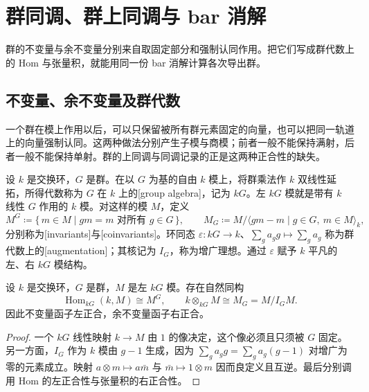 
\section{群同调、群上同调与 bar 消解}
\label{b4:sec:1101}

群的不变量与余不变量分别来自取固定部分和强制认同作用。把它们写成群代数上的 Hom 与张量积，就能用同一份 bar 消解计算各次导出群。

%
%

\subsection{不变量、余不变量及群代数}
\label{b4:subsec:1101:01}

一个群在模上作用以后，可以只保留被所有群元素固定的向量，也可以把同一轨道上的向量强制认同。这两种做法分别产生子模与商模；前者一般不能保持满射，后者一般不能保持单射。群的上同调与同调记录的正是这两种正合性的缺失。

\begin{definition}\label{b4:def:group-invariants}
设 \(k\) 是交换环，\(G\) 是群。在以 \(G\) 为基的自由 \(k\) 模上，将群乘法作 \(k\) 双线性延拓，所得代数称为 \(G\) 在 \(k\) 上的[group algebra]，记为 \(kG\)。左 \(kG\) 模就是带有 \(k\) 线性 \(G\) 作用的 \(k\) 模。对这样的模 \(M\)，定义
\[
M^G\coloneqq\{\,m\in M\mid gm=m\text{ 对所有 }g\in G\,\},
\qquad
M_G\coloneqq M/\langle gm-m\mid g\in G,\ m\in M\rangle_k,
\]
分别称为[invariants]与[coinvariants]。环同态
\(\varepsilon:kG\to k\)、\(\sum_g a_g g\mapsto\sum_g a_g\) 称为群代数上的[augmentation]；其核记为 \(I_G\)，称为增广理想。通过 \(\varepsilon\) 赋予 \(k\) 平凡的左、右 \(kG\) 模结构。
\end{definition}

\begin{proposition}\label{b4:prop:group-invariant-functors}
设 \(k\) 是交换环，\(G\) 是群，\(M\) 是左 \(kG\) 模。存在自然同构
\[
\operatorname{Hom}_{kG}(k,M)\cong M^G,
\qquad k\otimes_{kG}M\cong M_G=M/I_GM.
\]
因此不变量函子左正合，余不变量函子右正合。
\end{proposition}
\begin{proof}
一个 \(kG\) 线性映射 \(k\to M\) 由 \(1\) 的像决定，这个像必须且只须被 \(G\) 固定。另一方面，\(I_G\) 作为 \(k\) 模由 \(g-1\) 生成，因为
\(\sum_g a_g g=\sum_g a_g(g-1)\) 对增广为零的元素成立。映射 \(a\otimes m\mapsto a\bar m\) 与 \(\bar m\mapsto1\otimes m\) 因而良定义且互逆。最后分别调用 Hom 的左正合性与张量积的右正合性。
\end{proof}

